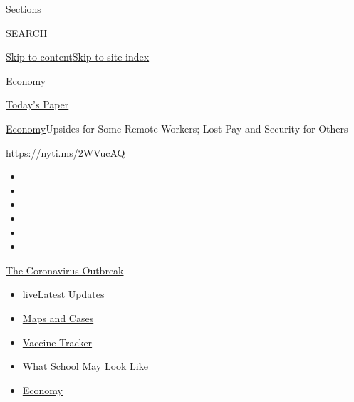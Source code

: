 Sections

SEARCH

\protect\hyperlink{site-content}{Skip to
content}\protect\hyperlink{site-index}{Skip to site index}

\href{https://www.nytimes3xbfgragh.onion/section/business/economy}{Economy}

\href{https://myaccount.nytimes3xbfgragh.onion/auth/login?response_type=cookie\&client_id=vi}{}

\href{https://www.nytimes3xbfgragh.onion/section/todayspaper}{Today's
Paper}

\href{/section/business/economy}{Economy}\textbar{}Upsides for Some
Remote Workers; Lost Pay and Security for Others

\url{https://nyti.ms/2WVucAQ}

\begin{itemize}
\item
\item
\item
\item
\item
\item
\end{itemize}

\href{https://www.nytimes3xbfgragh.onion/news-event/coronavirus?action=click\&pgtype=Article\&state=default\&region=TOP_BANNER\&context=storylines_menu}{The
Coronavirus Outbreak}

\begin{itemize}
\tightlist
\item
  live\href{https://www.nytimes3xbfgragh.onion/2020/08/01/world/coronavirus-covid-19.html?action=click\&pgtype=Article\&state=default\&region=TOP_BANNER\&context=storylines_menu}{Latest
  Updates}
\item
  \href{https://www.nytimes3xbfgragh.onion/interactive/2020/us/coronavirus-us-cases.html?action=click\&pgtype=Article\&state=default\&region=TOP_BANNER\&context=storylines_menu}{Maps
  and Cases}
\item
  \href{https://www.nytimes3xbfgragh.onion/interactive/2020/science/coronavirus-vaccine-tracker.html?action=click\&pgtype=Article\&state=default\&region=TOP_BANNER\&context=storylines_menu}{Vaccine
  Tracker}
\item
  \href{https://www.nytimes3xbfgragh.onion/interactive/2020/07/29/us/schools-reopening-coronavirus.html?action=click\&pgtype=Article\&state=default\&region=TOP_BANNER\&context=storylines_menu}{What
  School May Look Like}
\item
  \href{https://www.nytimes3xbfgragh.onion/live/2020/07/31/business/stock-market-today-coronavirus?action=click\&pgtype=Article\&state=default\&region=TOP_BANNER\&context=storylines_menu}{Economy}
\end{itemize}

